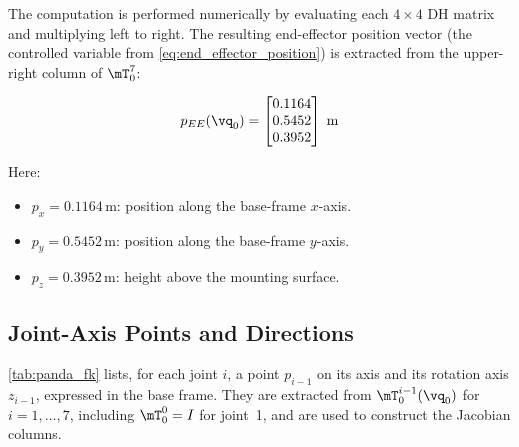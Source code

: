 The computation is performed numerically by evaluating each $4\times4$ DH
matrix and multiplying left to right.
The resulting end-effector position vector (the controlled variable
from \cref{eq:end_effector_position}) is extracted from the upper-right column of
$\mT_0^7$:

\begin{equation}
\label{eq:pe_panda}
p_{EE}(\vq_0) =
\begin{bmatrix}
0.1164 \\ 0.5452 \\ 0.3952
\end{bmatrix}
\;\mathrm{m}
\end{equation}

Here:

\begin{itemize}
  \item $p_x = 0.1164\,\mathrm{m}$: position along the base-frame $x$-axis.
  \item $p_y = 0.5452\,\mathrm{m}$: position along the base-frame $y$-axis.
  \item $p_z = 0.3952\,\mathrm{m}$: height above the mounting surface.
\end{itemize}

\subsection{Joint-Axis Points and Directions}

\cref{tab:panda_fk} lists, for each joint \(i\), a point
\(p_{i-1}\) on its axis and its rotation axis
\(z_{i-1}\), expressed in the base frame. They are extracted from
\(\mT_0^{i-1}(\vq_0)\) for \(i=1,\ldots,7\), including
\(\mT_0^0=I\) for joint~1, and are used to construct the Jacobian columns.

